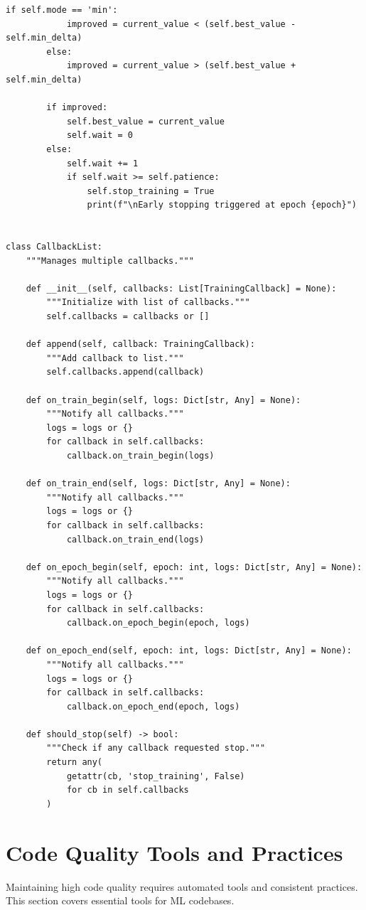 \begin{lstlisting}[style=python, caption=Observer pattern for monitoring training]
        if self.mode == 'min':
            improved = current_value < (self.best_value - self.min_delta)
        else:
            improved = current_value > (self.best_value + self.min_delta)

        if improved:
            self.best_value = current_value
            self.wait = 0
        else:
            self.wait += 1
            if self.wait >= self.patience:
                self.stop_training = True
                print(f"\nEarly stopping triggered at epoch {epoch}")


class CallbackList:
    """Manages multiple callbacks."""

    def __init__(self, callbacks: List[TrainingCallback] = None):
        """Initialize with list of callbacks."""
        self.callbacks = callbacks or []

    def append(self, callback: TrainingCallback):
        """Add callback to list."""
        self.callbacks.append(callback)

    def on_train_begin(self, logs: Dict[str, Any] = None):
        """Notify all callbacks."""
        logs = logs or {}
        for callback in self.callbacks:
            callback.on_train_begin(logs)

    def on_train_end(self, logs: Dict[str, Any] = None):
        """Notify all callbacks."""
        logs = logs or {}
        for callback in self.callbacks:
            callback.on_train_end(logs)

    def on_epoch_begin(self, epoch: int, logs: Dict[str, Any] = None):
        """Notify all callbacks."""
        logs = logs or {}
        for callback in self.callbacks:
            callback.on_epoch_begin(epoch, logs)

    def on_epoch_end(self, epoch: int, logs: Dict[str, Any] = None):
        """Notify all callbacks."""
        logs = logs or {}
        for callback in self.callbacks:
            callback.on_epoch_end(epoch, logs)

    def should_stop(self) -> bool:
        """Check if any callback requested stop."""
        return any(
            getattr(cb, 'stop_training', False)
            for cb in self.callbacks
        )
\end{lstlisting}

\section{Code Quality Tools and Practices}

Maintaining high code quality requires automated tools and consistent practices. This section covers essential tools for ML codebases.

